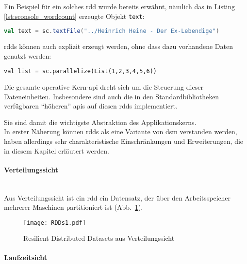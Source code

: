 Ein Beispiel für ein solches \gls{rdd} wurde bereits erwähnt, nämlich das in Listing \ref{lst:sconsole_wordcount} erzeugte Objekt \lstinline|text|:\\

\begin{lstlisting}[language=Scala, firstline=10, lastline=10, ]
val text = sc.textFile("../Heinrich Heine - Der Ex-Lebendige")
\end{lstlisting}

\Glspl{rdd} können auch explizit erzeugt werden, ohne dass dazu vorhandene Daten genutzt werden:\\

\begin{lstlisting}
val list = sc.parallelize(List(1,2,3,4,5,6))
\end{lstlisting}

Die gesamte operative Kern-\gls{api} dreht sich um die Steuerung dieser Dateneinheiten. Insbesondere sind auch die in den Standardbibliotheken verfügbaren "`höheren"' \glspl{api} auf diesen \glspl{rdd} implementiert.

Sie sind damit die wichtigste Abstraktion des Applikationskerns.\\

In erster Näherung können \glspl{rdd} als eine Variante von \gls{dsm}\cite{Nitzberg:1991:DSM:112827.112855} \cite{Mat12} verstanden werden, haben allerdings sehr charakteristische Einschränkungen und Erweiterungen, die in diesem Kapitel erläutert werden.\\

\paragraph{Verteilungssicht}\\

Aus Verteilungssicht ist ein \gls{rdd} ein Datensatz, der über den Arbeitsspeicher mehrerer Maschinen partitioniert ist (Abb.~\ref{fig:rdds1}).

\begin{figure}[ht!]
	\centering
  \texttt{[image: RDDs1.pdf]}
	\caption{Resilient Distributed Datasets aus Verteilungssicht}
	\label{fig:rdds1}
\end{figure}

\paragraph{Laufzeitsicht}\\

